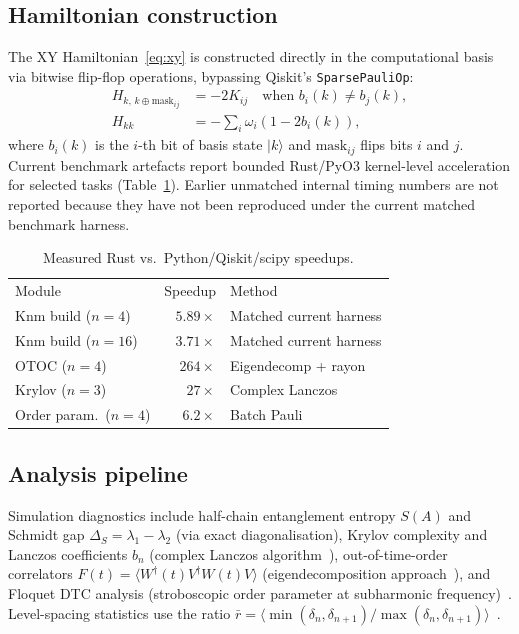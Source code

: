 \documentclass[twocolumn,prl,superscriptaddress,showpacs,floatfix]{revtex4-2}
\begin{document}
\subsection{Hamiltonian construction}

The XY Hamiltonian~\eqref{eq:xy} is constructed directly in the
computational basis via bitwise flip-flop operations, bypassing
Qiskit's \texttt{SparsePauliOp}:
%
\begin{align}
  H_{k,\, k \oplus \mathrm{mask}_{ij}} &= -2K_{ij}
    \quad\text{when } b_i(k) \neq b_j(k), \\
  H_{kk} &= -\sum_i \omega_i (1 - 2b_i(k)),
\end{align}
%
where $b_i(k)$ is the $i$-th bit of basis state $|k\rangle$ and
$\mathrm{mask}_{ij}$ flips bits $i$ and $j$. Current benchmark artefacts
report bounded Rust/PyO3 kernel-level acceleration for selected tasks
(Table~\ref{tab:speedup}). Earlier unmatched internal timing numbers are
not reported because they have not been reproduced under the current
matched benchmark harness.

\begin{table}[b]
\caption{\label{tab:speedup}%
Measured Rust vs.\ Python/Qiskit/scipy speedups.}
\begin{ruledtabular}
\begin{tabular}{lrl}
Module & Speedup & Method \\
\colrule
Knm build ($n=4$) & $5.89\times$ & Matched current harness \\
Knm build ($n=16$) & $3.71\times$ & Matched current harness \\
OTOC ($n=4$) & $264\times$ & Eigendecomp + rayon \\
Krylov ($n=3$) & $27\times$ & Complex Lanczos \\
Order param.\ ($n=4$) & $6.2\times$ & Batch Pauli \\
\end{tabular}
\end{ruledtabular}
\end{table}

\subsection{Analysis pipeline}

Simulation diagnostics include half-chain entanglement entropy $S(A)$
and Schmidt gap $\Delta_S = \lambda_1 - \lambda_2$ (via exact
diagonalisation), Krylov complexity and Lanczos coefficients $b_n$
(complex Lanczos algorithm~\cite{delCampo2025}), out-of-time-order
correlators $F(t) = \langle W^\dagger(t) V^\dagger W(t) V\rangle$
(eigendecomposition approach~\cite{Maldacena2016}), and Floquet DTC
analysis (stroboscopic order parameter at subharmonic
frequency)~\cite{Else2016}. Level-spacing statistics use the ratio
$\bar{r} = \langle\min(\delta_n, \delta_{n+1}) /
\max(\delta_n, \delta_{n+1})\rangle$~\cite{Oganesyan2007}.
\end{document}

